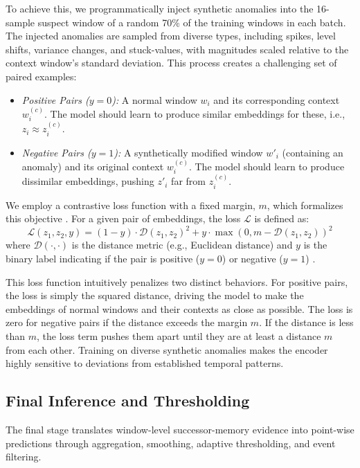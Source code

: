 \documentclass[journal]{IEEEtran}
\begin{document}
To achieve this, we programmatically inject synthetic anomalies into the 16-sample suspect window of a random 70\% of the training windows in each batch. The injected anomalies are sampled from diverse types, including spikes, level shifts, variance changes, and stuck-values, with magnitudes scaled relative to the context window's standard deviation. This process creates a challenging set of paired examples:
\begin{itemize}[noitemsep, topsep=0pt, leftmargin=*]
    \item \textit{Positive Pairs ($y=0$):} A normal window $w_i$ and its corresponding context $w_i^{(c)}$. The model should learn to produce similar embeddings for these, i.e., $z_i \approx z_i^{(c)}$.
    \item \textit{Negative Pairs ($y=1$):} A synthetically modified window $w'_i$ (containing an anomaly) and its original context $w_i^{(c)}$. The model should learn to produce dissimilar embeddings, pushing $z'_i$ far from $z_i^{(c)}$.
\end{itemize}

We employ a contrastive loss function with a fixed margin, $m$, which formalizes this objective \cite{le2020contrastive}. For a given pair of embeddings, the loss $\mathcal{L}$ is defined as:
\begin{equation}
\mathcal{L}(z_1, z_2, y) = (1-y) \cdot \mathcal{D}(z_1, z_2)^2 + y \cdot \max(0, m - \mathcal{D}(z_1, z_2))^2
\label{eq:contrastive_loss}
\end{equation}
where $\mathcal{D}(\cdot, \cdot)$ is the distance metric (e.g., Euclidean distance) and $y$ is the binary label indicating if the pair is positive ($y=0$) or negative ($y=1$) \cite{kostadinov2015vector}.

This loss function intuitively penalizes two distinct behaviors. For positive pairs, the loss is simply the squared distance, driving the model to make the embeddings of normal windows and their contexts as close as possible. The loss is zero for negative pairs if the distance exceeds the margin $m$. If the distance is less than $m$, the loss term pushes them apart until they are at least a distance $m$ from each other. Training on diverse synthetic anomalies makes the encoder highly sensitive to deviations from established temporal patterns.

\subsection{Final Inference and Thresholding}
\label{subsec:inference_thresholding}
The final stage translates window-level successor-memory evidence into point-wise predictions through aggregation, smoothing, adaptive thresholding, and event filtering.
\end{document}
